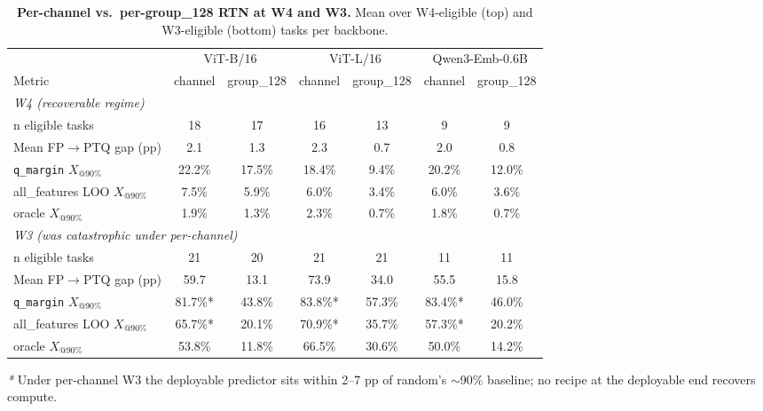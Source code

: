 \documentclass{article}
\makeatletter
\newcommand{\fp}{\textsc{FP}\xspace}
\newcommand{\ptq}{\textsc{PTQ}\xspace}
\newcommand{\xat}[1]{\ensuremath{X_{@#1\%}}}
\makeatother
\begin{document}
\begin{table}[t]
\centering
\caption{\textbf{Per-channel vs.\ per-group\_128 RTN at W4 and W3.} Mean over W4-eligible (top) and W3-eligible (bottom) tasks per backbone.}
\label{tab:ablation_recipe}
\small
\setlength{\tabcolsep}{4pt}
\begin{tabular}{lcccccc}
\toprule
& \multicolumn{2}{c}{ViT-B/16} & \multicolumn{2}{c}{ViT-L/16} & \multicolumn{2}{c}{Qwen3-Emb-0.6B} \\
\cmidrule(lr){2-3} \cmidrule(lr){4-5} \cmidrule(lr){6-7}
Metric & channel & group\_128 & channel & group\_128 & channel & group\_128 \\
\midrule
\multicolumn{7}{l}{\textit{W4 (recoverable regime)}} \\
n eligible tasks                & 18    & 17    & 16    & 13    & 9     & 9     \\
Mean \fp$\to$\ptq{} gap (pp)    & 2.1   & 1.3   & 2.3   & 0.7   & 2.0   & 0.8   \\
\texttt{q\_margin} \xat{90}     & 22.2\% & 17.5\% & 18.4\% & 9.4\%  & 20.2\% & 12.0\% \\
all\_features LOO \xat{90}      & 7.5\%  & 5.9\%  & 6.0\%  & 3.4\%  & 6.0\%  & 3.6\%  \\
oracle \xat{90}                 & 1.9\%  & 1.3\%  & 2.3\%  & 0.7\%  & 1.8\%  & 0.7\%  \\
\midrule
\multicolumn{7}{l}{\textit{W3 (was catastrophic under per-channel)}} \\
n eligible tasks                & 21    & 20    & 21    & 21    & 11    & 11    \\
Mean \fp$\to$\ptq{} gap (pp)    & 59.7  & 13.1  & 73.9  & 34.0  & 55.5  & 15.8  \\
\texttt{q\_margin} \xat{90}     & 81.7\%* & 43.8\% & 83.8\%* & 57.3\% & 83.4\%* & 46.0\% \\
all\_features LOO \xat{90}      & 65.7\%* & 20.1\% & 70.9\%* & 35.7\% & 57.3\%* & 20.2\% \\
oracle \xat{90}                 & 53.8\% & 11.8\% & 66.5\% & 30.6\% & 50.0\% & 14.2\% \\
\bottomrule
\end{tabular}
\flushleft\small\textit{*} Under per-channel W3 the deployable predictor sits within 2--7 pp of random's $\sim$90\% baseline; no recipe at the deployable end recovers compute.
\end{table}
\end{document}
